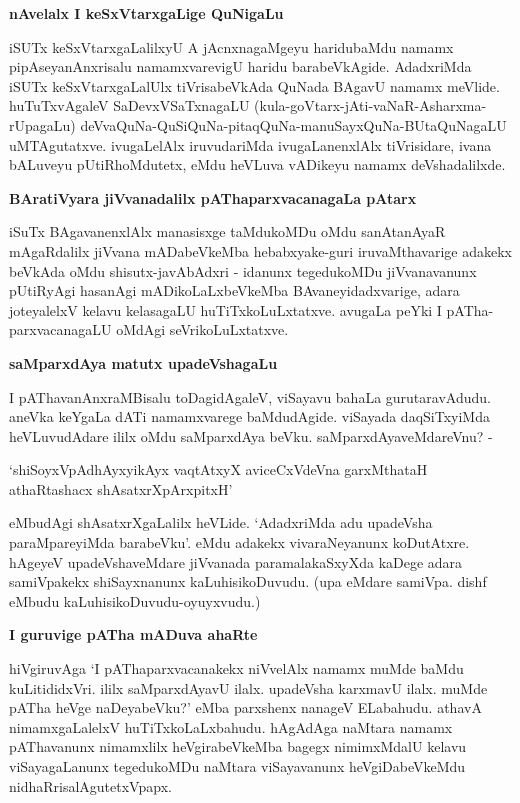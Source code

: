 {\bigskip
\noindent
{\large\bf nAvelalx I keSxVtarxgaLige QuNigaLu}}\label{page104}
\medskip

\noindent
iSUTx keSxVtarxgaLalilxyU A jAcnxnagaMgeyu haridubaMdu namamx pipAseyanAnxrisalu namamxvarevigU haridu barabeVkAgide. AdadxriMda iSUTx keSxVtarxgaLalUlx tiVrisabeVkAda QuNada BAgavU namamx meVlide. huTuTx\-vAgaleV SaDevxVSaTxnagaLU (kula-goVtarx-\-jAti-vaNaR-Asharxma-rUpagaLu) deVvaQuNa-QuSiQuNa\--pitaq\-QuNa-manuSayx\break\-QuNa-BUtaQuNagaLU uMTAgutatxve. ivugaLelAlx iruvudariMda ivugaLanenxlAlx tiVrisi\-dare, ivana bALuveyu pUtiRhoMdutetx, eMdu heVLuva vADikeyu \hbox{namamx} deVshadalilxde.

{\bigskip
\noindent
{\large\bf BAratiVyara jiVvanadalilx pAThaparxvacanagaLa pAtarx}}\label{page105}
\medskip

\noindent
iSuTx BAgavanenxlAlx manasisxge taMdukoMDu oMdu sanAtanAyaR mAgaRdalilx jiVvana mADabeV\-keMba hebabxyake-guri iruvaMthavarige adakekx beVkAda oMdu shisutx-javAbAdxri - idanunx tegedukoMDu jiVvana\-vanunx pUtiRyAgi hasanAgi mADikoLaLxbeVkeMba BAvaneyidadxvarige, adara joteyalelxV kelavu kelasa\-gaLU huTiTxkoLuLxtatxve. avugaLa peYki I pATha-parxvacanagaLU oMdAgi seVrikoLuLxtatxve.

{\bigskip
\noindent
{\large\bf saMparxdAya matutx upadeVshagaLu}}\label{page105}
\medskip

\noindent
I pAThavanAnxraMBisalu toDagidAgaleV, viSayavu bahaLa gurutaravAdudu. aneVka keYgaLa dATi namamx\-varege baMdudAgide. viSayada daqSiTxyiMda heVLuvudAdare ililx oMdu saMparxdAya beVku. saMparx\-dAyaveMdareVnu? -

\begin{shloka}
`shiSoyxVpAdhAyxyikAyx vaqtAtxyX aviceCxVdeVna garxMthataH athaRtashacx shAsatxrXpArxpitxH'\label{105}
\end{shloka}

\noindent
eMbudAgi shAsatxrXgaLalilx heVLide. `AdadxriMda adu upadeVsha paraMpareyiMda barabeVku'. eMdu adakekx vivaraNeyanunx koDutAtxre. hAgeyeV upadeVshaveMdare jiVvanada paramalakaSxyXda kaDege adara samiVpakekx shiSayxnanunx kaLuhisikoDuvudu. (upa eMdare samiVpa. dishf eMbudu kaLuhisikoDuvudu\--oyuyx\-vudu.)

{\bigskip
\noindent
{\large\bf I guruvige pATha mADuva ahaRte}}\label{page105}
\medskip

\noindent
hiVgiruvAga `I pAThaparxvacanakekx niVvelAlx namamx muMde baMdu kuLitididxVri. ililx saMparxdAyavU ilalx. upadeVsha karxmavU ilalx. muMde pATha heVge naDeyabeVku?' eMba parxshenx nanageV ELabahudu. athavA nimamx\-gaLalelxV huTiTxkoLaLxbahudu. hAgAdAga naMtara namamx pAThavanunx nimamxlilx heVgirabeVkeMba bagegx nimimxM\-dalU kelavu viSayagaLanunx tegedukoMDu naMtara viSayavanunx heVgiDabeVkeMdu nidhaR\-risalAgutetxVpapx.

